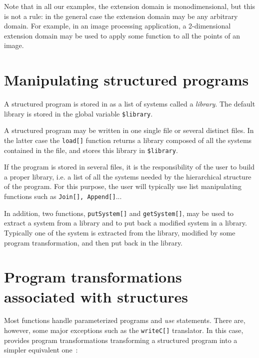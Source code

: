 Note that in all our examples, the extension domain is
monodimensional, but this is not a rule: in the general case the
extension domain may be any arbitrary {\alfa} domain. For example, in
an image processing application, a 2-dimensional extension domain may
be used to apply some function to all the points of an image.

\section{Manipulating structured programs}

A structured program is stored in {\mmalfa} as a {\mma} list of
systems called a \emph{library}. The default library is stored in the
global variable \verb!$library!.

A structured program may be written in one single file or several
distinct files.  In the latter case the \texttt{load[]} function
returns a library composed of all the systems contained in the file,
and stores this library in \verb!$library!. %

If the program is stored in several files, it is the responsibility of
the user to build a proper library, i.e. a {\mma} list of all the
systems needed by the hierarchical structure of the program. For this
purpose, the user will typically use {\mma} list manipulating
functions such as \texttt{Join[], Append[]}...

In addition, two functions, \texttt{putSystem[]} and
\texttt{getSystem[]}, may be used to extract a system from a library
and to put back a modified system in a library. Typically one of the
system is extracted from the library, modified by some program
transformation, and then put back in the library.\index{\getSystem[]}




\section{Program transformations associated with structures}

Most {\mmalfa} functions handle parameterized programs and \emph{use}
statements. There are, however, some major exceptions such as the
\texttt{writeC[]} translator. In this case, {\mmalfa}
provides program transformations transforming a structured program
into a simpler equivalent one~:


